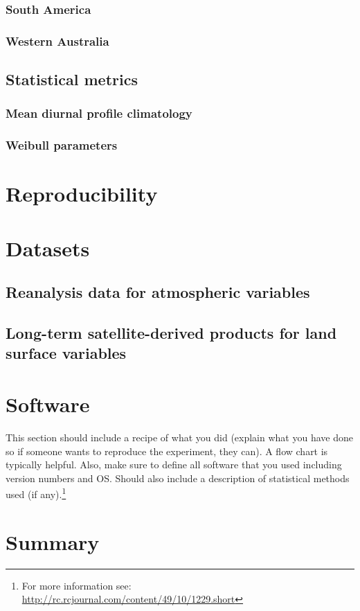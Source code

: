 \subsubsection{South America}

\subsubsection{Western Australia}

\subsection{Statistical metrics}

\subsubsection{Mean diurnal profile climatology}

\subsubsection{Weibull parameters}

\section{Reproducibility}

\section{Datasets}

\subsection{Reanalysis data for atmospheric variables}

\subsection{Long-term satellite-derived products for land surface variables}

\section{Software}

This section should include a recipe of what you did (explain what you have done so if someone wants to reproduce the experiment, they can).  A flow chart is typically helpful.  Also, make sure to define all software that you used including version numbers and OS.  Should also include a description of statistical methods used (if any).\footnote{For more information see: \url{http://rc.rcjournal.com/content/49/10/1229.short}}

\blindtext

\section*{Summary}
\blindtext